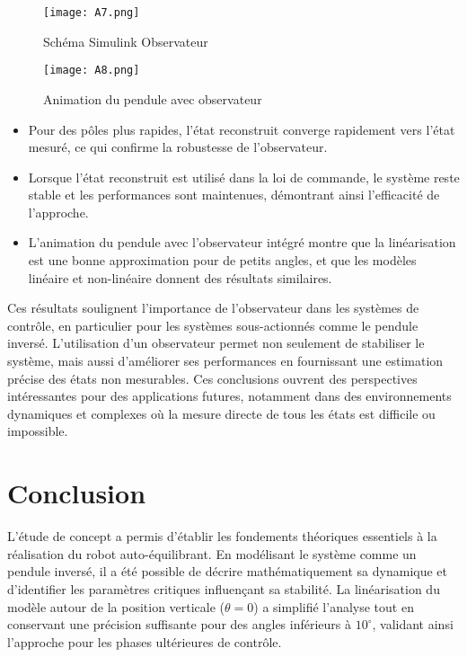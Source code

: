 \documentclass{report}
\begin{document}
\begin{figure}[h!]
    \centering
    \texttt{[image: A7.png]} %
    \caption{Schéma Simulink Observateur}
    \label{fig:A7}
\end{figure}

\begin{figure}[h!]
    \centering
    \texttt{[image: A8.png]} %
    \caption{Animation du pendule avec observateur}
    \label{fig:A8}
\end{figure}

\begin{itemize}
    \item Pour des pôles plus rapides, l'état reconstruit converge rapidement vers l'état mesuré, ce qui confirme la robustesse de l'observateur.
    \item Lorsque l'état reconstruit est utilisé dans la loi de commande, le système reste stable et les performances sont maintenues, démontrant ainsi l'efficacité de l'approche.
    \item L'animation du pendule avec l'observateur intégré montre que la linéarisation est une bonne approximation pour de petits angles, et que les modèles linéaire et non-linéaire donnent des résultats similaires.
\end{itemize}

Ces résultats soulignent l'importance de l'observateur dans les systèmes de contrôle, en particulier pour les systèmes sous-actionnés comme le pendule inversé. L'utilisation d'un observateur permet non seulement de stabiliser le système, mais aussi d'améliorer ses performances en fournissant une estimation précise des états non mesurables. Ces conclusions ouvrent des perspectives intéressantes pour des applications futures, notamment dans des environnements dynamiques et complexes où la mesure directe de tous les états est difficile ou impossible.
\vspace{7cm}
\section*{Conclusion }

L’étude de concept a permis d’établir les fondements théoriques essentiels à la réalisation du robot auto-équilibrant. En modélisant le système comme un pendule inversé, il a été possible de décrire mathématiquement sa dynamique et d’identifier les paramètres critiques influençant sa stabilité. La linéarisation du modèle autour de la position verticale (\(\theta = 0\)) a simplifié l’analyse tout en conservant une précision suffisante pour des angles inférieurs à \(10^\circ\), validant ainsi l’approche pour les phases ultérieures de contrôle.  
\end{document}
